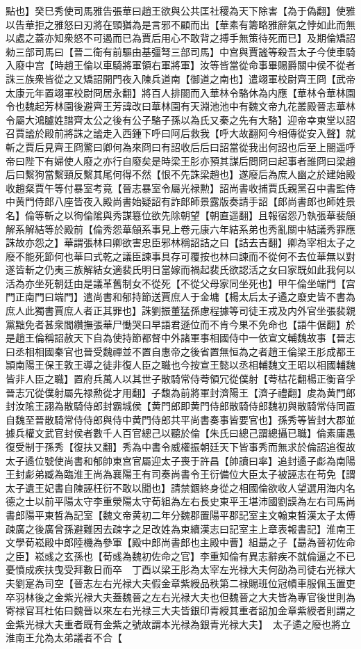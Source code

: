 點也】癸巳秀使司馬雅告張華曰趙王欲與公共匡社稷為天下除害【為于偽翻】使雅以告華拒之雅怒曰刃將在頸猶為是言邪不顧而出【華素有籌略雅辭氣之悖如此而無以處之蓋亦知衆怒不可遏而已為賈后用心不敢背之搏手無策待死而已】及期倫矯詔勑三部司馬曰【晉二衛有前驅由基彊弩三部司馬】中宫與賈謐等殺吾太子今使車騎入廢中宫【時趙王倫以車騎將軍領右軍將軍】汝等皆當從命事畢賜爵關中侯不從者誅三族衆皆從之又矯詔開門夜入陳兵道南【御道之南也】遣翊軍校尉齊王冏【武帝太康元年置翊軍校尉冏居永翻】將百人排閤而入華林令駱休為内應【華林令華林園令也魏起芳林園後避齊王芳諱改曰華林園有天淵池池中有魏文帝九花叢殿晉志華林令屬大鴻臚姓譜齊太公之後有公子駱子孫以為氏又秦之先有大駱】迎帝幸東堂以詔召賈謐於殿前將誅之謐走入西鍾下呼曰阿后救我【呼大故翻阿今相傳從安入聲】就斬之賈后見齊王冏驚曰卿何為來冏曰有詔收后后曰詔當從我出何詔也后至上閤遥呼帝曰陛下有婦使人廢之亦行自廢矣是時梁王肜亦預其謀后問冏曰起事者誰冏曰梁趙后曰繫狗當繫頸反繫其尾何得不然【恨不先誅梁趙也】遂廢后為庶人幽之於建始殿收趙粲賈午等付暴室考竟【晉志暴室令屬光禄勲】詔尚書收捕賈氏親黨召中書監侍中黄門侍郎八座皆夜入殿尚書始疑詔有詐郎師景露版奏請手詔【郎尚書郎也師姓景名】倫等斬之以徇倫隂與秀謀簒位欲先除朝望【朝直遥翻】且報宿怨乃執張華裴頠解系解結等於殿前【倫秀怨華頠系事見上卷元康六年結系弟也秀亂關中結議秀罪應誅故亦怨之】華謂張林曰卿欲害忠臣邪林稱詔詰之曰【詰去吉翻】卿為宰相太子之廢不能死節何也華曰式乾之議臣諫事具存可覆按也林曰諫而不從何不去位華無以對遂皆斬之仍夷三族解結女適裴氏明日當嫁而禍起裴氏欲認活之女曰家既如此我何以活為亦坐死朝廷由是議革舊制女不從死【不從父母家同坐死也】甲午倫坐端門【宫門正南門曰端門】遣尚書和郁持節送賈庶人于金墉【楊太后太子遹之廢史皆不書為庶人此獨書賈庶人者正其罪也】誅劉振董猛孫慮程據等司徒王戎及内外官坐張裴親黨黜免者甚衆閻纘撫張華尸慟哭曰早語君遜位而不肯今果不免命也【語牛倨翻】於是趙王倫稱詔赦天下自為使持節都督中外諸軍事相國侍中一依宣文輔魏故事【晉志曰丞相相國秦官也晉受魏禪並不置自惠帝之後省置無恒為之者趙王倫梁王肜成都王頴南陽王保王敦王導之徒非復人臣之職也今按宣王懿以丞相輔魏文王昭以相國輔魏皆非人臣之職】置府兵萬人以其世子散騎常侍荂領冗從僕射【荂枯花翻楊正衡音孚晉志冗從僕射屬先禄勲從才用翻】子馥為前將軍封濟陽王【濟子禮翻】䖍為黄門郎封汝隂王詡為散騎侍郎封霸城侯【黄門郎即黄門侍郎散騎侍郎魏初與散騎常侍同置自魏至晉散騎常侍侍郎與侍中黄門侍郎共平尚書奏事皆要官也】孫秀等皆封大郡並據兵權文武官封侯者數千人百官總己以聽於倫【朱氏曰總己謂總攝已職】倫素庸愚復受制于孫秀【復扶又翻】秀為中書令威權振朝廷天下皆事秀而無求於倫詔追復故太子遹位號使尚書和郁帥東宫官屬迎太子喪于許昌【帥讀曰率】追封遹子虨為南陽王封虨弟臧為臨淮王尚為襄陽王有司奏尚書令王衍備位大臣太子被誣志在苟免【謂太子遺王妃書自陳誣枉衍不敢以聞也】請禁錮終身從之相國倫欲收人望選用海内名德之士以前平陽太守李重滎陽太守荀組為左右長史東平王堪沛國劉謨為左右司馬尚書郎陽平東晳為記室【魏文帝黄初二年分魏郡置陽平郡記室主文翰束晳漢太子太傅疎廣之後廣曾孫避難因去疎字之足改姓為束續漢志曰記室主上章表報書記】淮南王文學荀崧殿中郎陸機為參軍【殿中郎尚書郎也主殿中曹】組朂之子【朂為晉初佐命之臣】崧彧之玄孫也【荀彧為魏初佐命之官】李重知倫有異志辭疾不就倫逼之不已憂憤成疾扶曳受拜數日而卒　丁酉以梁王肜為太宰左光禄大夫何劭為司徒右光禄大夫劉寔為司空【晉志左右光禄大夫假金章紫綬品秩第二禄賜班位冠幘車服佩玉置吏卒羽林後之金紫光禄大夫蓋魏晉之左右光禄大夫也但魏晉之大夫皆為專官後世則為寄禄官耳杜佑曰魏晉以來左右光禄三大夫皆銀印青綬其重者詔加金章紫綬者則謂之金紫光禄大夫重者既有金紫之號故謂本光禄為銀青光禄大夫】　太子遹之廢也將立淮南王允為太弟議者不合【